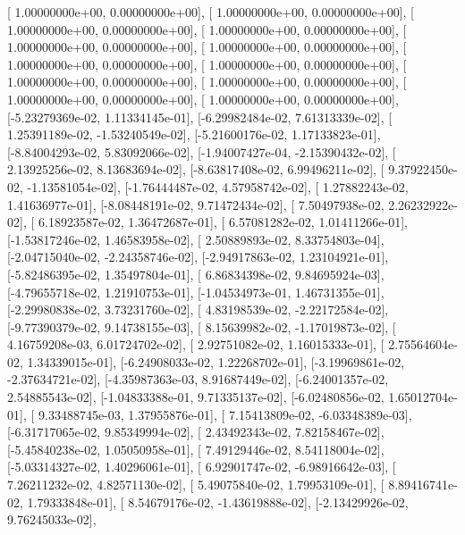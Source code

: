 \documentclass{article}
\begin{document}
       [ 1.00000000e+00,  0.00000000e+00],
       [ 1.00000000e+00,  0.00000000e+00],
       [ 1.00000000e+00,  0.00000000e+00],
       [ 1.00000000e+00,  0.00000000e+00],
       [ 1.00000000e+00,  0.00000000e+00],
       [ 1.00000000e+00,  0.00000000e+00],
       [ 1.00000000e+00,  0.00000000e+00],
       [ 1.00000000e+00,  0.00000000e+00],
       [ 1.00000000e+00,  0.00000000e+00],
       [ 1.00000000e+00,  0.00000000e+00],
       [ 1.00000000e+00,  0.00000000e+00],
       [ 1.00000000e+00,  0.00000000e+00],
       [-5.23279369e-02,  1.11334145e-01],
       [-6.29982484e-02,  7.61313339e-02],
       [ 1.25391189e-02, -1.53240549e-02],
       [-5.21600176e-02,  1.17133823e-01],
       [-8.84004293e-02,  5.83092066e-02],
       [-1.94007427e-04, -2.15390432e-02],
       [ 2.13925256e-02,  8.13683694e-02],
       [-8.63817408e-02,  6.99496211e-02],
       [ 9.37922450e-02, -1.13581054e-02],
       [-1.76444487e-02,  4.57958742e-02],
       [ 1.27882243e-02,  1.41636977e-01],
       [-8.08448191e-02,  9.71472434e-02],
       [ 7.50497938e-02,  2.26232922e-02],
       [ 6.18923587e-02,  1.36472687e-01],
       [ 6.57081282e-02,  1.01411266e-01],
       [-1.53817246e-02,  1.46583958e-02],
       [ 2.50889893e-02,  8.33754803e-04],
       [-2.04715040e-02, -2.24358746e-02],
       [-2.94917863e-02,  1.23104921e-01],
       [-5.82486395e-02,  1.35497804e-01],
       [ 6.86834398e-02,  9.84695924e-03],
       [-4.79655718e-02,  1.21910753e-01],
       [-1.04534973e-01,  1.46731355e-01],
       [-2.29980838e-02,  3.73231760e-02],
       [ 4.83198539e-02, -2.22172584e-02],
       [-9.77390379e-02,  9.14738155e-03],
       [ 8.15639982e-02, -1.17019873e-02],
       [ 4.16759208e-03,  6.01724702e-02],
       [ 2.92751082e-02,  1.16015333e-01],
       [ 2.75564604e-02,  1.34339015e-01],
       [-6.24908033e-02,  1.22268702e-01],
       [-3.19969861e-02, -2.37634721e-02],
       [-4.35987363e-03,  8.91687449e-02],
       [-6.24001357e-02,  2.54885543e-02],
       [-1.04833388e-01,  9.71335137e-02],
       [-6.02480856e-02,  1.65012704e-01],
       [ 9.33488745e-03,  1.37955876e-01],
       [ 7.15413809e-02, -6.03348389e-03],
       [-6.31717065e-02,  9.85349994e-02],
       [ 2.43492343e-02,  7.82158467e-02],
       [-5.45840238e-02,  1.05050958e-01],
       [ 7.49129446e-02,  8.54118004e-02],
       [-5.03314327e-02,  1.40296061e-01],
       [ 6.92901747e-02, -6.98916642e-03],
       [ 7.26211232e-02,  4.82571130e-02],
       [ 5.49075840e-02,  1.79953109e-01],
       [ 8.89416741e-02,  1.79333848e-01],
       [ 8.54679176e-02, -1.43619888e-02],
       [-2.13429926e-02,  9.76245033e-02],
\end{document}
